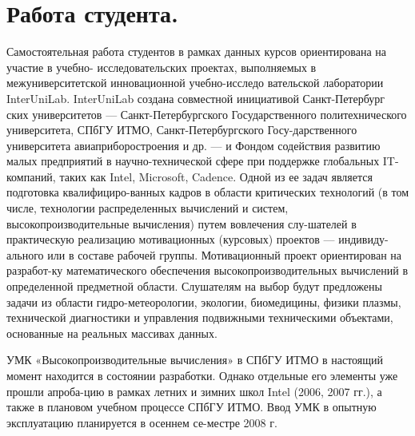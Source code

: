 \documentclass[11pt]{article}
\begin{document}
\section{Работа студента.}
Самостоятельная работа студентов в рамках данных курсов ориентирована на участие в учебно- \-исследовательских проектах, выполняемых в межуниверситетской инновационной учебно-исследо \-вательской лаборатории InterUniLab. InterUniLab создана совместной инициативой Санкт-Петербург \-ских университетов — Санкт-Петербургского Государственного политехнического университета, СПбГУ ИТМО, Санкт-Петер\-бургского Госу-дарственного университета авиаприборостроения и др. — и Фондом содействия развитию малых предприятий в научно-технической сфере при поддержке глобальных IT-компаний, таких как Intel, Microsoft, Cadence. Одной из ее задач является подготовка квалифициро-ванных кадров в области критических технологий (в том числе, технологии расп\-ределенных вычислений и систем, высокопроизводительные вычисления) путем вовлечения слу-шателей в практическую реализацию мотивационных (курсовых) проектов — индивиду-ального или в составе рабочей группы. Мотивационный проект ориентирован на разработ-ку математического обеспечения высокопроизводительных вычислений в определенной предметной области. Слушателям на выбор будут предложены задачи из области гидро-метеорологии, экологии, биомедицины, физики плазмы, технической диагностики и управления подвижными техническими объектами, основанные на реальных массивах данных.
\par УМК «Высокопроизводительные вычисления» в СПбГУ ИТМО в настоящий момент находится в состоянии разработки. Однако отдельные его элементы уже прошли апроба-цию в рамках летних и зимних школ Intel (2006, 2007 гг.), а также в плановом учебном процессе СПбГУ ИТМО. Ввод УМК в опытную эксплуатацию планируется в осеннем се-местре 2008 г.
\newpage
\pagestyle{fancy}
\fancyhf{}
\lfoot{\thepage}
\cfoot{\today}
\rfoot{\currfilename}
\end{document}
